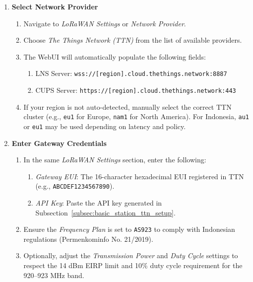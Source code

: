 \begin{enumerate}
    \item \textbf{Select Network Provider}
          \begin{enumerate}
              \item Navigate to \textit{LoRaWAN Settings} or \textit{Network Provider}.
              \item Choose \textit{The Things Network (TTN)} from the list of available providers.
              \item The WebUI will automatically populate the following fields:
                    \begin{enumerate}
                        \item LNS Server: \texttt{wss://[region].cloud.thethings.network:8887}
                        \item CUPS Server: \texttt{https://[region].cloud.thethings.network:443}
                    \end{enumerate}
              \item If your region is not auto-detected, manually select the correct TTN cluster (e.g., \texttt{eu1} for Europe, \texttt{nam1} for North America). For Indonesia, \texttt{au1} or \texttt{eu1} may be used depending on latency and policy.
          \end{enumerate}

    \item \textbf{Enter Gateway Credentials}
          \begin{enumerate}
              \item In the same \textit{LoRaWAN Settings} section, enter the following:
                    \begin{enumerate}
                        \item \textit{Gateway EUI}: The 16-character hexadecimal EUI registered in TTN (e.g., \texttt{ABCDEF1234567890}).
                        \item \textit{API Key}: Paste the API key generated in Subsection~\ref{subsec:basic_station_ttn_setup}.
                    \end{enumerate}
              \item Ensure the \textit{Frequency Plan} is set to \texttt{AS923} to comply with Indonesian regulations (Permenkominfo No. 21/2019).
              \item Optionally, adjust the \textit{Transmission Power} and \textit{Duty Cycle} settings to respect the 14 dBm EIRP limit and 10\% duty cycle requirement for the 920–923 MHz band.
          \end{enumerate}


\end{enumerate}
